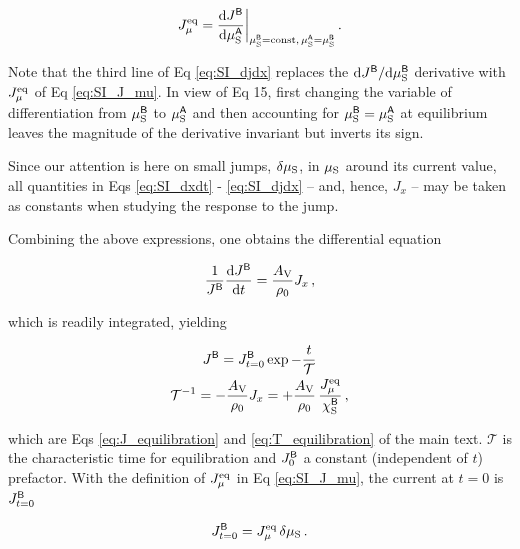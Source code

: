 \documentclass[english,aps,prb,showkeys,reprint]{revtex4-2}
\newcommand{\dd}{ \mathrm{d} }
\newcommand{\be}{\begin{equation}}
\newcommand{\ee}{\end{equation}}
\begin{document}
\be
\label{eq:SI_J_mu}
J^{\rm eq}_{\mu}
=
\frac{\dd J^{\sf B}}{\dd \mu^{\sf A}_{\rm S}} \bigg \rvert_{\mu^{\sf B}_{\rm S} = \rm{const}, \, \mu^{\sf A}_{\rm S} = \mu^{\sf B}_{\rm S}}  \,.
\ee

Note that the third line of Eq \ref{eq:SI_djdx} replaces the $\dd J^{\sf B}/\dd \mu^{\sf B}_{\rm S}$ derivative with $J^{\rm eq}_{\mu}$ of Eq \ref{eq:SI_J_mu}. In view of Eq 15, first changing the variable of differentiation from $\mu^{\sf B}_{\rm S}$ to $\mu^{\sf A}_{\rm S}$ and then accounting for $\mu^{\sf B}_{\rm S} = \mu^{\sf A}_{\rm S}$ at equilibrium leaves the magnitude of the derivative invariant but inverts its sign.

Since our attention is here on small jumps, $\delta \mu_{\rm S}$, in $\mu_{\rm  S}$ around its current value, all quantities in Eqs \ref{eq:SI_dxdt} - \ref{eq:SI_djdx} -- and, hence, $J_x$ -- may be taken as constants when studying the response to the jump.

Combining the above expressions, one obtains the differential equation

\be
\label{eq:SI_J_vs_t_DEQ}
\frac{1}{J^{\sf B}}
\frac{\dd J^{\sf B}}{\dd t}
=
\frac{A_{\rm V}}{\rho_0} J_x \,,
\ee

which is readily integrated, yielding

\begin{gather}

\nonumber
J^{\sf B}
=
J^{\sf B}_{t = 0}  \exp - \frac{t}{\mathcal T}
\\

\nonumber
{\mathcal T}^{-1}
=
- \frac{A_{\rm V}}{\rho_0} J_x
=
+\frac{A_{\rm V}}{\rho_0} \, \frac{J^{\rm eq}_{\mu}}{\chi^{\sf B}_{\rm S}} \,,
\end{gather}

which are Eqs \ref{eq:J_equilibration} and \ref{eq:T_equilibration} of the main text. ${\mathcal T}$ is the characteristic time for equilibration and $J^{\sf B}_0$ a constant (independent of $t$) prefactor. With the definition of $J^{\rm eq}_{\mu}$ in Eq \ref{eq:SI_J_mu}, the current at $t = 0$ is $J^{\sf B}_{t = 0}$

\be
J^{\sf B}_{t = 0}
=
J^{\rm eq}_{\mu} \, \delta \mu_{\rm S} \,.
\ee
\end{document}
